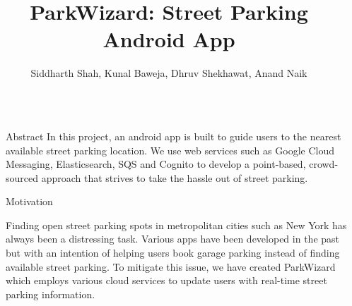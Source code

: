 \documentclass[final]{beamer}
\title{ParkWizard: Street Parking Android App} %
\author{Siddharth Shah, Kunal Baweja, Dhruv Shekhawat, Anand Naik} %
\newlength{\sepwid}
\newlength{\onecolwid}
\begin{document}


\begin{frame}[t] %

\begin{columns}[t] %

\begin{column}{\sepwid}\end{column} %

\begin{column}{\onecolwid} %


\begin{alertblock}{Abstract}
In this project, an android app is built to guide users to the nearest available street parking location. We use web services such as Google Cloud Messaging, Elasticsearch, SQS and Cognito to develop a point-based, crowd-sourced approach that strives to take the hassle out of street parking.
\end{alertblock}

\begin{block}{Motivation}

Finding open street parking spots in metropolitan cities such as New York has always been a distressing task. Various apps have been developed in the past but with an intention of helping users book garage parking instead of finding available street parking. To mitigate this issue, we have created ParkWizard which employs various cloud services to update users with real-time street parking information.
\end{block}



\end{column}
\end{columns}
\end{frame}
\end{document}
